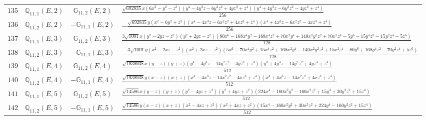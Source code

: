 \documentclass[fleqn,8pt,landscape]{jsarticle}
\begin{document}
\begin{table}[ht!]
\begin{center}
\begin{tabular}{cccl}
$ 135 $ & $ \mathbb{Q}_{11,1}(E,2) $ & $ \mathbb{G}_{11,2}(E,2) $ & $ \frac{\sqrt{692835} x \left(6 x^{2} - y^{2} - z^{2}\right) \left(y^{4} - 4 y^{3} z - 6 y^{2} z^{2} + 4 y z^{3} + z^{4}\right) \left(y^{4} + 4 y^{3} z - 6 y^{2} z^{2} - 4 y z^{3} + z^{4}\right)}{256} $ \\
$ 136 $ & $ \mathbb{Q}_{11,2}(E,2) $ & $ -\mathbb{G}_{11,1}(E,2) $ & $ - \frac{\sqrt{692835} y \left(x^{2} - 6 y^{2} + z^{2}\right) \left(x^{4} - 4 x^{3} z - 6 x^{2} z^{2} + 4 x z^{3} + z^{4}\right) \left(x^{4} + 4 x^{3} z - 6 x^{2} z^{2} - 4 x z^{3} + z^{4}\right)}{256} $ \\
$ 137 $ & $ \mathbb{Q}_{11,1}(E,3) $ & $ \mathbb{G}_{11,2}(E,3) $ & $ \frac{3 \sqrt{1001} x \left(y^{2} - 2 y z - z^{2}\right) \left(y^{2} + 2 y z - z^{2}\right) \left(80 x^{6} - 168 x^{4} y^{2} - 168 x^{4} z^{2} + 70 x^{2} y^{4} + 140 x^{2} y^{2} z^{2} + 70 x^{2} z^{4} - 5 y^{6} - 15 y^{4} z^{2} - 15 y^{2} z^{4} - 5 z^{6}\right)}{128} $ \\
$ 138 $ & $ \mathbb{Q}_{11,2}(E,3) $ & $ -\mathbb{G}_{11,1}(E,3) $ & $ - \frac{3 \sqrt{1001} y \left(x^{2} - 2 x z - z^{2}\right) \left(x^{2} + 2 x z - z^{2}\right) \left(5 x^{6} - 70 x^{4} y^{2} + 15 x^{4} z^{2} + 168 x^{2} y^{4} - 140 x^{2} y^{2} z^{2} + 15 x^{2} z^{4} - 80 y^{6} + 168 y^{4} z^{2} - 70 y^{2} z^{4} + 5 z^{6}\right)}{128} $ \\
$ 139 $ & $ \mathbb{Q}_{11,1}(E,4) $ & $ \mathbb{G}_{11,2}(E,4) $ & $ \frac{\sqrt{1939938} x \left(y - z\right) \left(y + z\right) \left(y^{4} - 4 y^{3} z - 14 y^{2} z^{2} - 4 y z^{3} + z^{4}\right) \left(y^{4} + 4 y^{3} z - 14 y^{2} z^{2} + 4 y z^{3} + z^{4}\right)}{512} $ \\
$ 140 $ & $ \mathbb{Q}_{11,2}(E,4) $ & $ -\mathbb{G}_{11,1}(E,4) $ & $ \frac{\sqrt{1939938} y \left(x - z\right) \left(x + z\right) \left(x^{4} - 4 x^{3} z - 14 x^{2} z^{2} - 4 x z^{3} + z^{4}\right) \left(x^{4} + 4 x^{3} z - 14 x^{2} z^{2} + 4 x z^{3} + z^{4}\right)}{512} $ \\
$ 141 $ & $ \mathbb{Q}_{11,1}(E,5) $ & $ \mathbb{G}_{11,2}(E,5) $ & $ \frac{\sqrt{14586} x \left(y - z\right) \left(y + z\right) \left(y^{2} - 4 y z + z^{2}\right) \left(y^{2} + 4 y z + z^{2}\right) \left(224 x^{4} - 160 x^{2} y^{2} - 160 x^{2} z^{2} + 15 y^{4} + 30 y^{2} z^{2} + 15 z^{4}\right)}{512} $ \\
$ 142 $ & $ \mathbb{Q}_{11,2}(E,5) $ & $ -\mathbb{G}_{11,1}(E,5) $ & $ \frac{\sqrt{14586} y \left(x - z\right) \left(x + z\right) \left(x^{2} - 4 x z + z^{2}\right) \left(x^{2} + 4 x z + z^{2}\right) \left(15 x^{4} - 160 x^{2} y^{2} + 30 x^{2} z^{2} + 224 y^{4} - 160 y^{2} z^{2} + 15 z^{4}\right)}{512} $ \\

\end{tabular}
\end{center}
\end{table}
\end{document}
